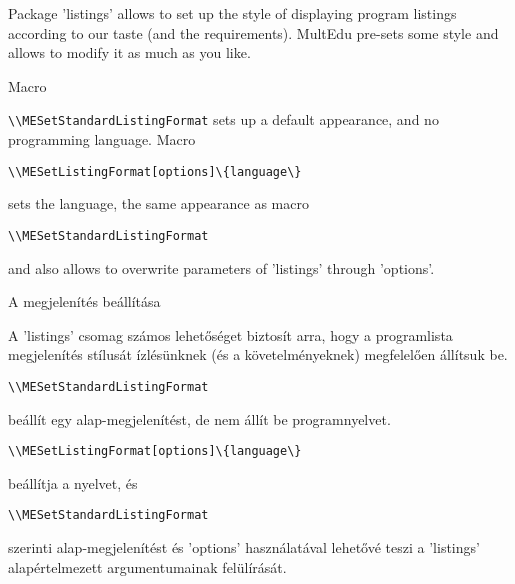 {
Package 'listings' allows to set up the style of displaying program listings
according to our taste (and the requirements).
MultEdu pre-sets some style and allows to modify it as much as you like.

Macro \par\noindent\lstinline|\\MESetStandardListingFormat| sets up a default appearance,
and no programming language. Macro \par\noindent\lstinline|\\MESetListingFormat[options]\{language\}|
\par\noindent sets the language, the same appearance as macro \par\noindent\lstinline|\\MESetStandardListingFormat|
\par\noindent and also allows to overwrite parameters of 'listings' through 'options'.
}
{A megjelenítés beállítása}
{
A 'listings' csomag számos lehetőséget biztosít arra, hogy a programlista megjelenítés stílusát ízlésünknek
(és a követelményeknek) megfelelően állítsuk be.

\noindent\lstinline|\\MESetStandardListingFormat| 
\par\noindent beállít egy alap-megjelenítést,
de nem állít be programnyelvet.
\par\noindent \lstinline|\\MESetListingFormat[options]\{language\}|
\par\noindent beállítja a nyelvet, és
\par\noindent\lstinline|\\MESetStandardListingFormat| 
\par\noindent szerinti alap-megjelenítést
és 'options' használatával lehetővé teszi a 'listings' alapértelmezett argumentumainak felülírását.
}



